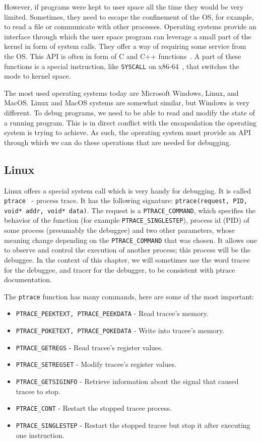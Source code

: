 However, if programs were kept to user space all the time they would be very
limited. Sometimes, they need to escape the confinement of the OS, for example,
to read a file or communicate with other processes. Operating systems provide
an interface through which the user space program can leverage a small part of
the kernel in form of system calls. They offer a way of requiring some service
from the OS. This API is often in form of C and C++
functions~\cite{os-concepts}. A part of these functions is a special
instruction, like \texttt{SYSCALL} on x86-64~\cite{intel-manual}, that switches
the mode to kernel space.

The most used operating systems today are Microsoft Windows, Linux, and MacOS.
Linux and MacOS systems are somewhat similar, but Windows is very different. To
debug programs, we need to be able to read and modify the state of a running
program. This is in direct conflict with the encapsulation the operating system
is trying to achieve. As such, the operating system must provide an API through
which we can do these operations that are needed for debugging.

\subsection{Linux}\label{section:linux-dbg}
Linux offers a special system call which is very handy for debugging. It is
called \texttt{ptrace}~\cite{ptrace} - process trace. It has the following
signature: \texttt{ptrace(request, PID, void* addr, void* data)}. The request
is a \texttt{PTRACE\_COMMAND}, which specifies the behavior of the function
(for example \texttt{PTRACE\_SINGLESTEP}), process id (PID) of some process
(presumably the debuggee) and two other parameters, whose meaning change
depending on the \texttt{PTRACE\_COMMAND} that was chosen. It allows one to
observe and control the execution of another process; this process will be the
debuggee. In the context of this chapter, we will sometimes use the word tracee
for the debuggee, and tracer for the debugger, to be consistent with ptrace
documentation.

The \texttt{ptrace} function has many commands, here are some of the most important:
\begin{itemize}
    \item \texttt{PTRACE\_PEEKTEXT, PTRACE\_PEEKDATA} - Read tracee's memory.
    \item \texttt{PTRACE\_POKETEXT, PTRACE\_POKEDATA} - Write into tracee's
          memory.
    \item \texttt{PTRACE\_GETREGS} - Read tracee's register values.
    \item \texttt{PTRACE\_SETREGSET} - Modify tracee's register values.
    \item \texttt{PTRACE\_GETSIGINFO} - Retrieve information about the signal
                                        that caused tracee to stop.
    \item \texttt{PTRACE\_CONT} - Restart the stopped tracee process.
    \item \texttt{PTRACE\_SINGLESTEP} - Restart the stopped tracee but
          stop it after executing one instruction.
\end{itemize}

